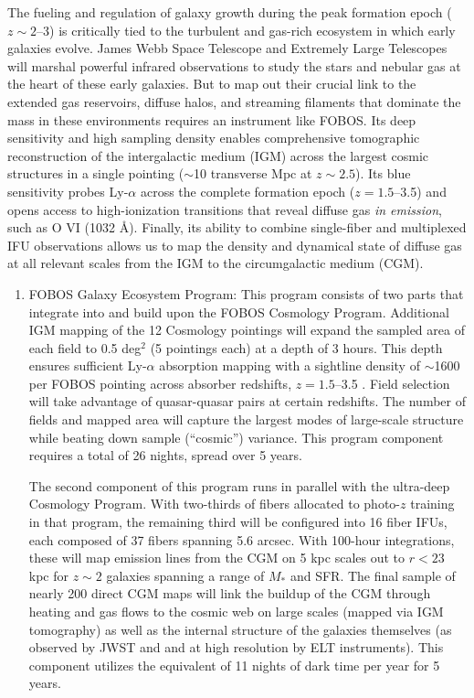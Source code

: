 \documentclass[oneside,11pt]{amsart}
\newcounter{chalno}
\newcommand{\chal}[1]{\refstepcounter{chalno}\label{#1}}
\begin{document}
The fueling and regulation of galaxy growth during the peak formation epoch ($z \sim2$--3) is critically tied to the turbulent and gas-rich ecosystem in which early galaxies evolve.  James Webb Space Telescope and Extremely Large Telescopes will marshal powerful infrared observations to study the stars and nebular gas at the heart of these early galaxies.  But to map out their crucial link to the extended gas reservoirs, diffuse halos, and streaming filaments that dominate the mass in these environments requires an instrument like FOBOS.  Its deep sensitivity and high sampling density enables comprehensive tomographic reconstruction of the intergalactic medium (IGM) across the largest cosmic structures in a single pointing ($\sim$10 transverse Mpc at $z \sim 2.5$).  Its blue sensitivity probes Ly-$\alpha$ across the complete formation epoch ($z = 1.5$--3.5) and opens access to high-ionization transitions that reveal diffuse gas \emph{in emission}, such as O VI (1032 \AA).  Finally, its ability to combine single-fiber and multiplexed IFU observations allows us to map the density and dynamical state of diffuse gas at all relevant scales from the IGM to the circumgalactic medium (CGM).




\begin{enumerate}[rightmargin=0.2cm,leftmargin=0.2cm]
%
\chal{phot}
%
\item[] {\textsf {\large FOBOS Galaxy Ecosystem Program:}} This program consists of two parts that integrate into and build upon the FOBOS Cosmology Program.  Additional IGM mapping of the 12 Cosmology pointings will expand the sampled area of each field to 0.5 deg$^2$ (5 pointings each) at a depth of 3 hours.  This depth ensures sufficient Ly-$\alpha$ absorption mapping with a sightline density of $\sim$1600 per FOBOS pointing across absorber redshifts, $z = 1.5$--3.5 \citep[see][]{lee16}.  Field selection will take advantage of quasar-quasar pairs at certain redshifts.  The number of fields and mapped area will capture the largest modes of large-scale structure while beating down sample (``cosmic'') variance.  This program component requires a total of 26 nights, spread over 5 years.

The second component of this program runs in parallel with the ultra-deep Cosmology Program.  With two-thirds of fibers allocated to photo-$z$ training in that program, the remaining third will be configured into 16 fiber IFUs, each composed of 37 fibers spanning 5.6 arcsec.  With 100-hour integrations, these will map emission lines from the CGM on 5 kpc scales out to $r < 23$ kpc for $z \sim 2$ galaxies spanning a range of $M_*$ and SFR.  The final sample of nearly 200 direct CGM maps will link the buildup of the CGM through heating and gas flows to the cosmic web on large scales (mapped via IGM tomography) as well as the internal structure of the galaxies themselves (as observed by JWST and and at high resolution by ELT instruments).  This component utilizes the equivalent of 11 nights of dark time per year for 5 years.

%
\end{enumerate}
\end{document}
